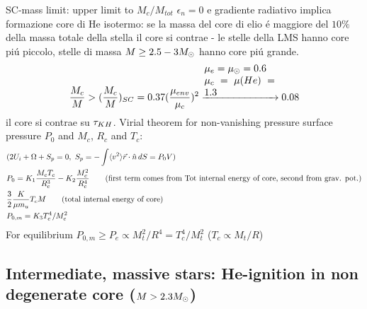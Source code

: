 \begin{frame}{SC-mass limit: upper limit to $M_c/M_{tot}$} 
$\epsilon_n=0$ e gradiente radiativo implica formazione core di He isotermo: se la massa del core di elio \'e maggiore del $10\%$ della massa totale della stella il core si contrae - le stelle della LMS hanno core pi\'u piccolo, stelle di massa $M\geq2.5-3M_{\odot}{}$  hanno core pi\'u grande.
\begin{equation*} 
\frac{M_c}{M}>(\frac{M_c}{M})_{SC}=0.37(\frac{\mu_{env}}{\mu_c})^2\xrightarrow{\parbox{2.5cm}{$\mu_e=\mu_{\odot}=0.6$\\$\mu_c=\mu(He)=1.3$}}0.08
\end{equation*}
il core si contrae su $\tau_{KH}{}$.
Virial theorem for non-vanishing pressure surface pressure $P_0$ and $M_c$, $R_c$ and $T_c$:
\begin{align*}  
&(2U_i+\Omega+S_p=0,\ S_p=-\int\exv{v^2}\Vec{r}\cdot\hat{n}\,dS=P_0V)\\
&P_0=K_1\frac{M_cT_c}{R_c^3}-K_2\frac{M_c^2}{R_c^4}\tag{first term comes from Tot internal energy of core, second from grav. pot.}\\
&\frac{3}{2}\frac{K}{\mu m_u}T_cM\tag{total internal energy of core}\\
&P_{0,m}=K_3T_c^4/M_c^2
\end{align*}
For equilibrium $P_{0,m}\geq P_e\propto M_t^2/R^4=T_c^4/M_t^2$ ($T_c\propto M_t/R$)
\end{frame}

\subsection{Intermediate, massive stars: He-ignition in non degenerate core ($M>2.3M_{\odot}{}$)}


